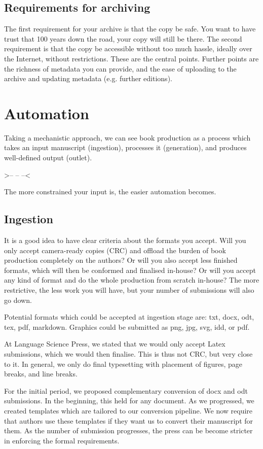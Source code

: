 \documentclass[guidelines,nonflat,modfonts] {langsci/langscibook}
\begin{document}
\subsection{Requirements for archiving}
The first requirement for your archive is that the copy be safe. You want to have trust that 100 years down the road, your copy will still be there. The second requirement is that the copy be accessible without too much hassle, ideally over the Internet, without restrictions. These are the central points. Further points are the richness of metadata you can provide, and the ease of uploading to the archive and updating metadata (e.g. further editions).

\section{Automation}
Taking a mechanistic approach, we can see book production as a process which takes an input manuscript (ingestion), processes it (generation), and produces well-defined output (outlet). 

\ea
>--  --  --< 
\z

The more constrained your input is, the easier automation becomes. 
 
                    
\subsection{Ingestion}
It is a good idea to have clear criteria about the formats you accept. Will you only accept camera-ready copies (CRC) and offload the burden of book production completely on the authors? Or will you also accept less finished formats, which will then be conformed and finalised in-house? Or will you accept any kind of format and do the whole production from scratch in-house? The more restrictive, the less work you will have, but your number of submissions will also go down. 

Potential formats which could be accepted at ingestion stage are: txt, docx, odt, tex, pdf, markdown. Graphics could be submitted as png, jpg, svg, idd, or pdf. 


At Language Science Press, we stated that we would only accept Latex submissions, which we would then finalise. This is thus not CRC, but very close to it. In general, we only do final typesetting with placement of figures, page breaks, and line breaks. 

For the initial period, we proposed complementary conversion of docx and odt submissions. In the beginning, this held for any document. As we progressed, we created templates which are tailored to our conversion pipeline. We now require that authors use these templates if they want us to convert their manuscript for them. As the number of submission progresses, the press can be become stricter in enforcing the formal requirements. 
\end{document}
